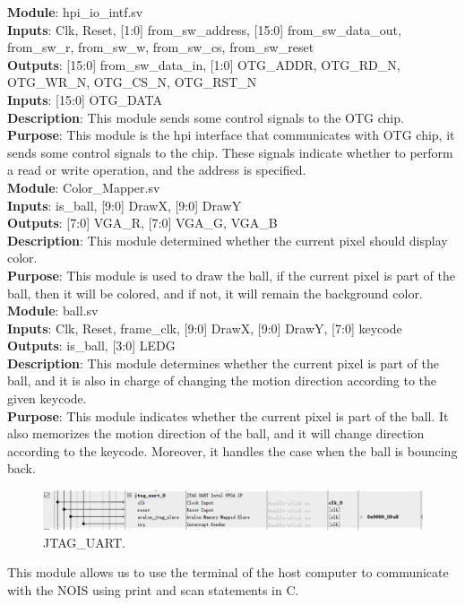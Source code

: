 \documentclass[12pt]{article}
\begin{document}
\textbf{Module}: hpi\_io\_intf.sv \\ 
\textbf{Inputs}: Clk, Reset, [1:0] from\_sw\_address, [15:0] from\_sw\_data\_out, from\_sw\_r, from\_sw\_w, from\_sw\_cs, from\_sw\_reset \\ 
\textbf{Outputs}: [15:0] from\_sw\_data\_in, [1:0] OTG\_ADDR, OTG\_RD\_N, OTG\_WR\_N, OTG\_CS\_N, OTG\_RST\_N \\
\textbf{Inputs}: [15:0] OTG\_DATA \\
\textbf{Description}: This module sends some control signals to the OTG chip. \\ 
\textbf{Purpose}: This module is the hpi interface that communicates with OTG chip, it sends some control signals to the chip. These signals indicate whether to perform a read or write operation, and the address is specified. \\

\textbf{Module}: Color\_Mapper.sv \\ 
\textbf{Inputs}: is\_ball, [9:0] DrawX, [9:0] DrawY \\ 
\textbf{Outputs}: [7:0] VGA\_R, [7:0] VGA\_G, VGA\_B \\
\textbf{Description}: This module determined whether the current pixel should display color. \\ 
\textbf{Purpose}: This module is used to draw the ball, if the current pixel is part of the ball, then it will be colored, and if not, it will remain the background color. \\

\textbf{Module}: ball.sv \\ 
\textbf{Inputs}: Clk, Reset, frame\_clk, [9:0] DrawX, [9:0] DrawY, [7:0] keycode \\ 
\textbf{Outputs}: is\_ball, [3:0] LEDG \\
\textbf{Description}: This module determines whether the current pixel is part of the ball, and it is also in charge of changing the motion direction according to the given keycode. \\ 
\textbf{Purpose}: This module indicates whether the current pixel is part of the ball. It also memorizes the motion direction of the ball, and it will change direction according to the keycode. Moreover, it handles the case when the ball is bouncing back. \\

\begin{figure}[H]
    \centering
    \includegraphics[width=16cm]{JTAG_UART.png}
    \caption{JTAG\_UART.}
\end{figure}
This module allows us to use the terminal of the host computer to communicate with the NOIS using print and scan statements in C.
\end{document}
